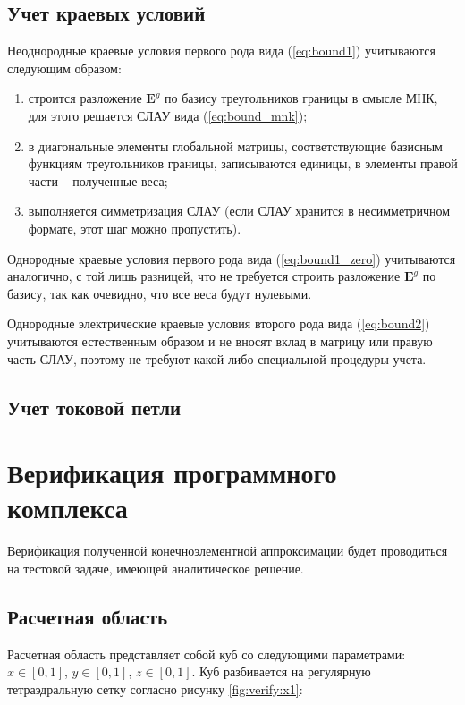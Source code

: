 \documentclass[a4paper,14pt]{article}
\begin{document}

\subsection{Учет краевых условий}

Неоднородные краевые условия первого рода вида (\ref{eq:bound1}) учитываются следующим образом:
\begin{enumerate}
	\item строится разложение $\mathbf{E}^g$ по базису треугольников границы в смысле МНК, для этого решается СЛАУ вида (\ref{eq:bound_mnk});
	\item в диагональные элементы глобальной матрицы, соответствующие базисным функциям треугольников границы, записываются единицы, в элементы правой части -- полученные веса;
	\item выполняется симметризация СЛАУ (если СЛАУ хранится в несимметричном формате, этот шаг можно пропустить).
\end{enumerate}

Однородные краевые условия первого рода вида (\ref{eq:bound1_zero}) учитываются аналогично, с той лишь разницей, что не требуется строить разложение $\mathbf{E}^g$ по базису, так как очевидно, что все веса будут нулевыми.

Однородные электрические краевые условия второго рода вида (\ref{eq:bound2}) учитываются естественным образом и не вносят вклад в матрицу или правую часть СЛАУ, поэтому не требуют какой-либо специальной процедуры учета.


\subsection{Учет токовой петли}


\clearpage
\section{Верификация программного комплекса}
Верификация полученной конечноэлементной аппроксимации будет проводиться на тестовой задаче, имеющей аналитическое решение.
\subsection{Расчетная область}
Расчетная область представляет собой куб со следующими параметрами: $x \in [0,1]$, $y \in [0,1]$, $z \in [0,1]$. Куб разбивается на регулярную тетраэдральную сетку согласно рисунку \ref{fig:verify:x1}:
\end{document}
